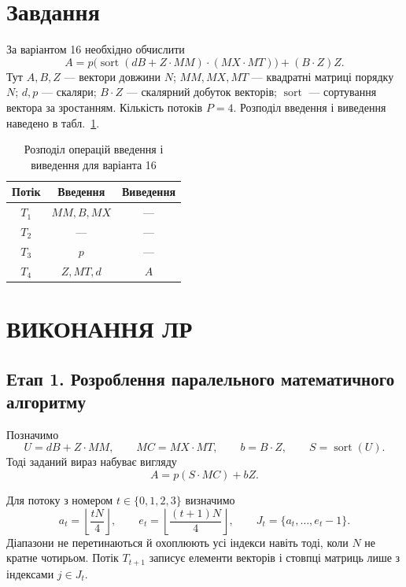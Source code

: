 \documentclass[12pt,a4paper]{article}
\begin{document}
\section{Завдання}
За варіантом 16 необхідно обчислити
\begin{equation}
 A=p\bigl(\operatorname{sort}(dB+Z\cdot MM)\cdot(MX\cdot MT)\bigr)
   +(B\cdot Z)Z.
 \label{eq:task}
\end{equation}
Тут $A,B,Z$ --- вектори довжини $N$; $MM,MX,MT$ --- квадратні матриці
порядку $N$; $d,p$ --- скаляри; $B\cdot Z$ --- скалярний добуток
векторів; $\operatorname{sort}$ --- сортування вектора за зростанням.
Кількість потоків $P=4$. Розподіл введення і виведення наведено в
табл.~\ref{tab:io}.

\begin{table}[H]
\centering\renewcommand{\arraystretch}{1.2}
\begin{tabular}{|c|c|c|}\hline
\textbf{Потік} & \textbf{Введення} & \textbf{Виведення}\\\hline
$T_1$ & $MM,B,MX$ & ---\\\hline
$T_2$ & --- & ---\\\hline
$T_3$ & $p$ & ---\\\hline
$T_4$ & $Z,MT,d$ & $A$\\\hline
\end{tabular}
\caption{Розподіл операцій введення і виведення для варіанта 16}
\label{tab:io}
\end{table}

\section{ВИКОНАННЯ ЛР}

\subsection{Етап 1. Розроблення паралельного математичного алгоритму}
Позначимо
\begin{equation}
 U=dB+Z\cdot MM,\qquad MC=MX\cdot MT,\qquad b=B\cdot Z,
 \qquad S=\operatorname{sort}(U).
\end{equation}
Тоді заданий вираз набуває вигляду
\begin{equation}
 A=p(S\cdot MC)+bZ.
\end{equation}

Для потоку з номером $t\in\{0,1,2,3\}$ визначимо
\begin{equation}
 a_t=\left\lfloor\frac{tN}{4}\right\rfloor,\qquad
 e_t=\left\lfloor\frac{(t+1)N}{4}\right\rfloor,\qquad
 J_t=\{a_t,\ldots,e_t-1\}.
 \label{eq:ranges}
\end{equation}
Діапазони не перетинаються й охоплюють усі індекси навіть тоді, коли
$N$ не кратне чотирьом. Потік $T_{t+1}$ записує елементи векторів і
стовпці матриць лише з індексами $j\in J_t$.
\end{document}
